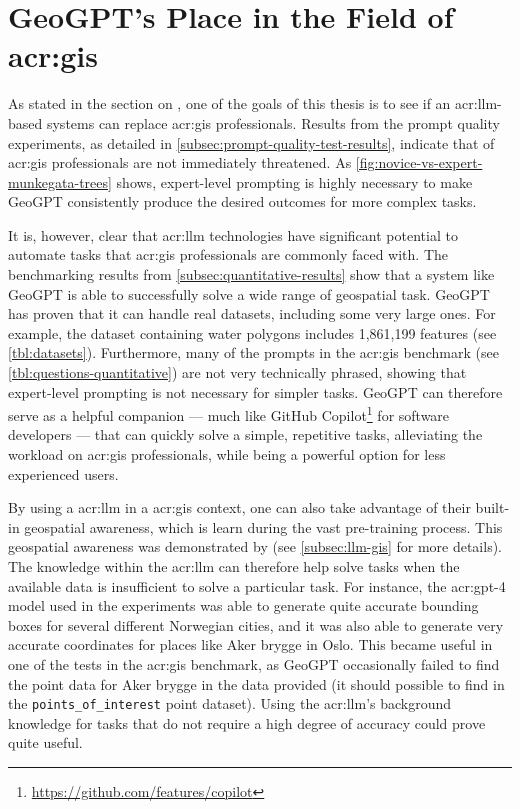 \section[GeoGPT's Place in the Field of GIS]{GeoGPT's Place in the Field of \acrshort{acr:gis}}
\label{sec:geogpt-in-gis}

As stated in the section on , one of the goals of this thesis is to see if an \acrshort{acr:llm}-based systems can replace \acrshort{acr:gis} professionals. Results from the prompt quality experiments, as detailed in \autoref{subsec:prompt-quality-test-results}, indicate that of \acrshort{acr:gis} professionals are not immediately threatened. As \autoref{fig:novice-vs-expert-munkegata-trees} shows, expert-level prompting is highly necessary to make GeoGPT consistently produce the desired outcomes for more complex tasks.

It is, however, clear that \acrshort{acr:llm} technologies have significant potential to automate tasks that \acrshort{acr:gis} professionals are commonly faced with. The benchmarking results from \autoref{subsec:quantitative-results} show that a system like GeoGPT is able to successfully solve a wide range of geospatial task. GeoGPT has proven that it can handle real datasets, including some very large ones. For example, the dataset containing water polygons includes 1,861,199 features (see \autoref{tbl:datasets}). Furthermore, many of the prompts in the \acrshort{acr:gis} benchmark (see \autoref{tbl:questions-quantitative}) are not very technically phrased, showing that expert-level prompting is not necessary for simpler tasks. GeoGPT can therefore serve as a helpful companion --- much like GitHub Copilot\footnote{\url{https://github.com/features/copilot}} for software developers --- that can quickly solve a simple, repetitive tasks, alleviating the workload on \acrshort{acr:gis} professionals, while being a powerful option for less experienced users.

By using a \acrlong{acr:llm} in a \acrshort{acr:gis} context, one can also take advantage of their built-in geospatial awareness, which is learn during the vast pre-training process. This geospatial awareness was demonstrated by \cite{robertsGPT4GEOHowLanguage2023} (see \autoref{subsec:llm-gis} for more details). The knowledge within the \acrshort{acr:llm} can therefore help solve tasks when the available data is insufficient to solve a particular task. For instance, the \acrshort{acr:gpt}-4 model used in the experiments was able to generate quite accurate bounding boxes for several different Norwegian cities, and it was also able to generate very accurate coordinates for places like Aker brygge in Oslo. This became useful in one of the tests in the \acrshort{acr:gis} benchmark, as GeoGPT occasionally failed to find the point data for Aker brygge in the data provided (it should possible to find in the \texttt{points\_of\_interest} point dataset). Using the \acrshort{acr:llm}'s background knowledge for tasks that do not require a high degree of accuracy could prove quite useful.

